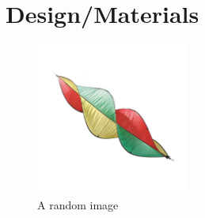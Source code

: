 \chapter{Design/Materials}

\lipsum[1]

\begin{figure}[h]
	\centering\includegraphics[height=5cm]{./images/fiiw}
	\caption{A random image}
\end{figure}
